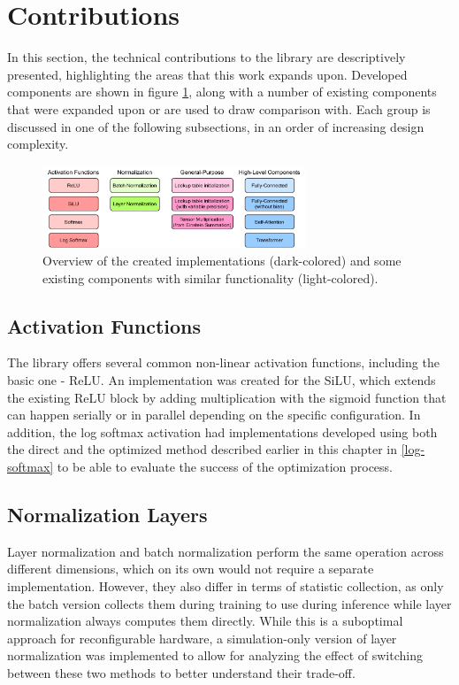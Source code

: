 \section{\hlsml Contributions}
In this section, the technical contributions to the \hlsml library are descriptively presented, highlighting the areas that this work expands upon. Developed components are shown in figure \ref{fig:hls4ml-contributions}, along with a number of existing components that were expanded upon or are used to draw comparison with. Each group is discussed in one of the following subsections, in an order of increasing design complexity.

\begin{figure}[hpt!]
  \centering
  \includegraphics[trim={0cm 0cm 0cm 0cm}, clip, width=0.7\textwidth, center]{quantization/hls4ml_blocks.pdf}
  \caption{Overview of the created implementations (dark-colored) and some existing components with similar functionality (light-colored).}
  \label{fig:hls4ml-contributions}
\end{figure}


\subsection{Activation Functions}
The library offers several common non-linear activation functions, including the basic one - ReLU. An implementation was created for the SiLU, which extends the existing ReLU block by adding multiplication with the sigmoid function that can happen serially or in parallel depending on the specific configuration. In addition, the log softmax activation had implementations developed using both the direct and the optimized method described earlier in this chapter in \cref{log-softmax} to be able to evaluate the success of the optimization process.

\subsection{Normalization Layers}
Layer normalization and batch normalization perform the same operation across different dimensions, which on its own would not require a separate implementation. However, they also differ in terms of statistic collection, as only the batch version collects them during training to use during inference while layer normalization always computes them directly. While this is a suboptimal approach for reconfigurable hardware, a simulation-only version of layer normalization was implemented to allow for analyzing the effect of switching between these two methods to better understand their trade-off.

